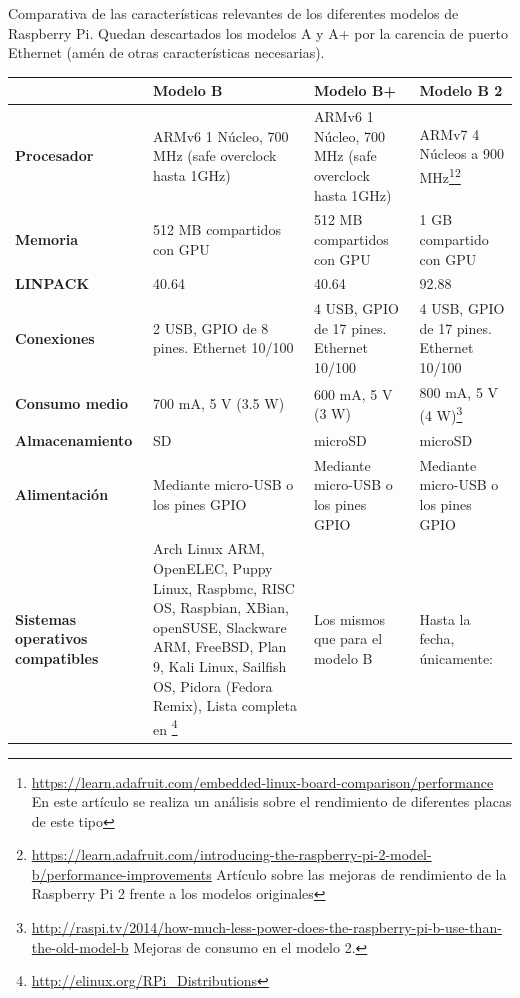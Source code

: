 Comparativa de las características relevantes de los diferentes modelos de Raspberry Pi.
Quedan descartados los modelos A y A+ por la carencia de puerto Ethernet (amén de otras características necesarias).
\begin{landscape}
\begin{table}[h]
\begin{tabular}{|p{3.2cm}|p{6cm}|p{6cm}|p{6cm}|}
\hline
 & \textbf{Modelo B} & \textbf{Modelo B+} & \textbf{Modelo B 2}\\ \hline
\textbf{Procesador} & ARMv6 1 Núcleo, 700 MHz (safe overclock hasta 1GHz) & ARMv6 1 Núcleo, 700 MHz (safe overclock hasta 1GHz) & ARMv7 4 Núcleos a 900 MHz\footnote{\href{https://learn.adafruit.com/embedded-linux-board-comparison/performance}{https://learn.adafruit.com/embedded-linux-board-comparison/performance} En este artículo se realiza un análisis sobre el rendimiento de diferentes placas de este tipo}\footnote{\href{https://learn.adafruit.com/introducing-the-raspberry-pi-2-model-b/performance-improvements}{https://learn.adafruit.com/introducing-the-raspberry-pi-2-model-b/performance-improvements} Artículo sobre las mejoras de rendimiento de la Raspberry Pi 2 frente a los modelos originales} \\ \hline
\textbf{Memoria} & 512 MB compartidos con GPU & 512 MB compartidos con GPU & 1 GB compartido con GPU\\ \hline
\textbf{LINPACK} \cite{hackaday:benchmarkpi2,gist:linpackbenchmark,elinux:benchmark} & 40.64 & 40.64 & 92.88\\ \hline
\textbf{Conexiones} & 2 USB, GPIO de 8 pines. Ethernet 10/100 & 4 USB, GPIO de 17 pines. Ethernet 10/100 & 4 USB, GPIO de 17 pines. Ethernet 10/100\\ \hline
\textbf{Consumo medio} & 700 mA, 5 V (3.5 W) & 600 mA, 5 V (3 W) & 800 mA, 5 V (4 W)\footnote{\href{http://raspi.tv/2014/how-much-less-power-does-the-raspberry-pi-b-use-than-the-old-model-b}{http://raspi.tv/2014/how-much-less-power-does-the-raspberry-pi-b-use-than-the-old-model-b} Mejoras de consumo en el modelo 2.}\\ \hline
\textbf{Almacenamiento} & SD & microSD & microSD\\ \hline
\textbf{Alimentación} & Mediante micro-USB o los pines GPIO & Mediante micro-USB o los pines GPIO &Mediante micro-USB o los pines GPIO\\ \hline
\textbf{Sistemas operativos compatibles} & 

Arch Linux ARM, OpenELEC, Puppy Linux, Raspbmc, RISC OS, Raspbian, XBian, openSUSE, Slackware ARM, FreeBSD, Plan 9, Kali Linux, Sailfish OS, Pidora (Fedora Remix), Lista completa en \footnote{\href{http://elinux.org/RPi\_Distributions}{http://elinux.org/RPi\_Distributions}} & Los mismos que para el modelo B & Hasta la fecha, únicamente:


\end{tabular}
\end{table}
\end{landscape}
